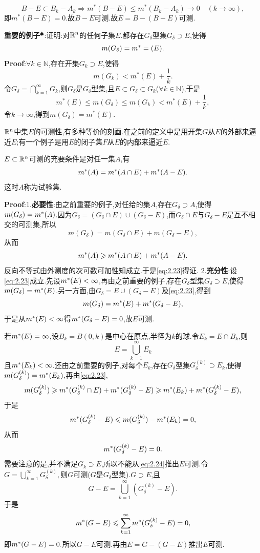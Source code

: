 $$
B-E\subset B_k-A_k \Rightarrow m^*(B-E)\leqslant m^*(B_k-A_k)\to 0 \quad (k\to\infty),
$$
即$m^*(B-E)=0$.故$B-E$可测.故$E=B-(B-E)$可测.\par
\textbf{重要的例子}$^\spadesuit$:证明:对$\mathbb{R} ^n$的任何子集$E$.都存在$G_{\delta}$型集$G_{\delta}\supset E$,使得  
$$
m(G_{\delta})=m^*=(E).
$$  
\qquad \textbf{Proof}:$\forall k\in\mathbb{N}$,存在开集$G_k\supset E$,使得
$$
m(G_k)<m^*(E)+\frac{1}{k}.
$$
令$G_\delta=\bigcap_{k=1}^\infty G_k$,则$G_\delta$是$G_\delta$型集,且$E\subset G_\delta\subset G_k$($\forall k\in\mathbb{N}$),于是
$$
m^*(E)\leqslant m(G_\delta)\leqslant m(G_k)<m^*(E)+\frac{1}{k},
$$
令$k\to\infty$,得到$m(G_\delta)=m^*(E)$.\par
$\mathbb{R} ^n$中集$E$的可测性,有多种等价的刻画.在之前的定义中是用开集$G$从$E$的外部来逼近$E$;有一个例子是用$E$的闭子集$F$从$E$的内部来逼近$E$.
\begin{tcolorbox}[colback=KuangNei,colframe=BianKuang,title=\textbf{Caratheodory条件},sharpish corners]
$E\subset\mathbb{R} ^n$可测的充要条件是对任一集$A$,有  
\begin{equation}
    m^*(A)=m^*(A\cap E)+m^*(A-E).
    \label{eq:2.23}
\end{equation}
这时$A$称为试验集.
\end{tcolorbox}
\textbf{Proof}:1.\textbf{必要性}:由之前重要的例子,对任给的集$A$,存在$G_\delta\supset A$,使得$m(G_\delta)=m^*(A)$.因为$G_\delta=(G_\delta\cap E)\cup(G_\delta-E)$,而$G_\delta\cap E$与$G_\delta-E$是互不相交的可测集,所以
$$
m(G_\delta)=m(G_\delta\cap E)+m(G_\delta-E),
$$
从而
$$
m^*(A)\geqslant m^*(A\cap E)+m^*(A-E).
$$
反向不等式由外测度的次可数可加性知成立.于是\eqref{eq:2.23}得证.
2.\textbf{充分性}:设\eqref{eq:2.23}成立.先设$m^*(E)<\infty$,再由之前重要的例子,存在$G_\delta$型集$G_\delta\supset E$,使得$m(G_\delta)=m^*(E)$.另一方面,由$G_\delta=E\cup(G_\delta-E)$及\eqref{eq:2.23},得到
$$
m(G_\delta)=m^*(E)+m^*(G_\delta-E),
$$
于是从$m^*(E)<\infty$得$m^*(G_\delta-E)=0$,故$E$可测.\par
若$m^*(E)=\infty$,设$B_k=B(0,k)$是中心在原点,半径为$k$的球.令$E_k=E\cap B_k$,则
$$
E=\bigcup_{k=1}^{\infty}E_k
$$
且$m^*(E_k)<\infty$.还由之前重要的例子,对每个$E_k$,存在$G_\delta$型集$G_\delta^{(k)}\supset E_k$,使得$m(G_\delta^{(k)})=m^*(E_k),$再由\eqref{eq:2.23},
$$
m(G_\delta^{(k)})\geqslant m^*(G_\delta^{(k)}\cap E)+m^*(G_\delta^{(k)}-E)\geqslant m^*(E_k)+m^*(G_\delta^{(k)}-E),
$$
于是
$$
m^*(G_\delta^{(k)}-E)\leqslant m(G_\delta^{(k)})-m^*(E_k)=0,
$$
从而
\begin{equation}
m^*(G_\delta^{(k)}-E)=0.
\label{eq:2.24}
\end{equation}
需要注意的是,并不满足$G_k\supset E$,所以不能从\eqref{eq:2.24}推出$E$可测.令$G=\bigcup_{k=1}^{\infty}G_\delta^{(k)},$则$G$可测($G$是$G_\delta$型集).$G\supset E$,且
$$
G-E=\bigcup_{k=1}^{\infty}(G_\delta^{(k)}-E).
$$
于是
$$
m^*(G-E)\leqslant\sum_{k=1}^{\infty}m^*(G_\delta^{(k)}-E)=0,
$$
即$m^*(G-E)=0.$所以$G-E$可测.再由$E=G-(G-E)$推出$E$可测.\par

